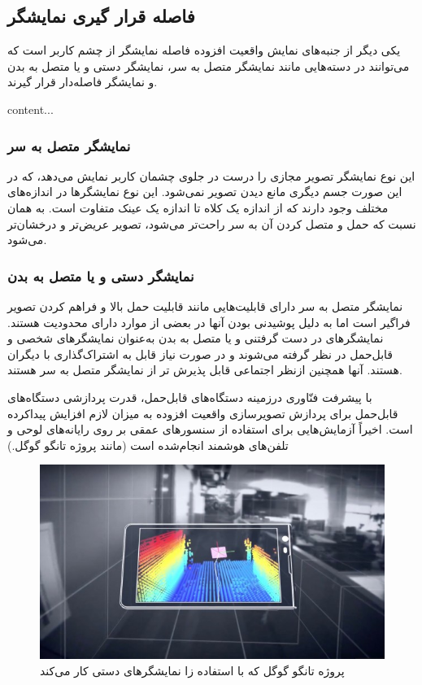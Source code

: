 \subsection{فاصله قرار گیری نمایشگر}
یکی دیگر از جنبه‌های نمایش واقعیت افزوده فاصله نمایشگر از چشم کاربر است که می‌توانند در دسته‌هایی مانند نمایشگر متصل به سر، نمایشگر دستی و یا متصل به بدن و نمایشگر فاصله‌دار قرار گیرند.

	content...

\subsubsection{نمایشگر متصل به سر}
این نوع نمایشگر تصویر مجازی را درست در جلوی چشمان کاربر نمایش می‌دهد، که در این صورت جسم دیگری مانع دیدن تصویر نمی‌شود. این نوع نمایشگرها در اندازه‌های مختلف وجود دارند که از اندازه یک کلاه تا اندازه یک عینک متفاوت است. به همان نسبت که حمل و متصل کردن آن به سر راحت‌تر می‌شود، تصویر عریض‌تر و درخشان‌تر می‌شود\cite{Billinghurst}.
\subsubsection{نمایشگر دستی و یا متصل به بدن}
نمایشگر متصل به سر دارای قابلیت‌هایی مانند قابلیت حمل بالا و فراهم کردن تصویر فراگیر است اما به دلیل پوشیدنی بودن آنها در بعضی از موارد دارای محدودیت هستند. نمایشگرهای در دست گرفتنی و یا متصل به بدن به‌عنوان نمایشگرهای شخصی و قابل‌حمل در نظر گرفته می‌شوند و در صورت نیاز قابل به اشتراک‌گذاری با دیگران هستند. آنها همچنین ازنظر اجتماعی قابل پذیرش تر از نمایشگر متصل به سر هستند.

با پیشرفت فنّاوری درزمینه دستگاه‌های قابل‌حمل، قدرت پردازشی دستگاه‌های قابل‌حمل برای پردازش تصویرسازی واقعیت افزوده به میزان لازم افزایش پیداکرده است. اخیراً آزمایش‌هایی برای استفاده از سنسورهای عمقی بر روی رایانه‌های لوحی و تلفن‌های هوشمند انجام‌شده است (مانند پروژه تانگو گوگل.) \protect{}

\begin{figure}
	\centering
	\includegraphics[width=1\linewidth]{image/tango}
	\caption {پروژه تانگو گوگل که با استفاده زا نمایشگرهای دستی کار می‌کند}
	\label{fig:tango}
\end{figure}
